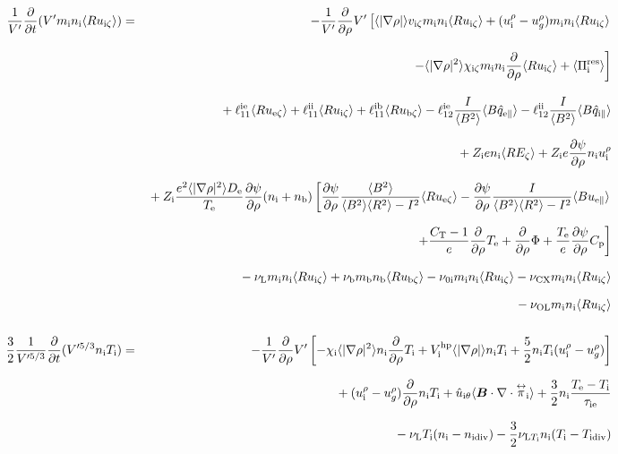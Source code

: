 \documentclass[11pt]{article}
\def\bvec#1{\leavevmode\hbox{\boldmath$#1$}}
\let\vec=\bvec
\def\r#1{{\rm#1}}
\def\aves#1{\langle#1\rangle}
\def\dd#1#2{\frac{\partial #1}{\partial #2}}
\def\tensor#1{\mathord{\displaystyle\mathop{#1}^\leftrightarrow}}
\def\para{\parallel}
\def\ddrho{\frac{\partial}{\partial\rho}}
\def\mi{m_\r{i}}
\def\mb{m_\r{b}}
\def\ni{n_\r{i}}
\def\nb{n_\r{b}}
\def\Te{T_\r{e}}
\def\Ti{T_\r{i}}
\def\Zi{Z_\r{i}}
\def\uezt{u_{\r{e}\zeta}}
\def\uizt{u_{\r{i}\zeta}}
\def\ubzt{u_{\r{b}\zeta}}
\def\uepara{u_{\r{e}\para}}
\def\ubpara{u_{\r{b}\para}}
\def\qhatepara{\hat{q}_{\r{e}\para}}
\def\qhatipara{\hat{q}_{\r{i}\para}}
\def\uirho{u_\r{i}^\rho}
\def\ugrho{u_{g}^\rho}
\def\chii{\chi_\r{i}}
\def\bri{\aves{B^2}\aves{R^2} - I^2}
\def\ddt{\frac{\partial}{\partial t}}
\def\De{D_\r{e}}
\def\nuni{\nu_\r{0i}}
\def\nuL{\nu_\r{L}}
\def\nuCX{\nu_\r{CX}}
\def\nub{\nu_\r{b}}
\def\nidiv{n_\r{idiv}}
\def\Tidiv{T_\r{idiv}}
\def\nuLTi{\nu_{\r{L}T_\r{i}}}
\def\nuOL{\nu_\r{OL}}
\begin{document}
\begin{eqnarray}
\\[5mm]
 \frac{1}{V'} \ddt (V' \mi \ni \aves{R \uizt}) &=&
%
  - \frac{1}{V'} \ddrho V' \left[  \aves{|\nabla\rho|} v_{\r{i}\zeta} \mi \ni \aves{R \uizt}
			       +   (\uirho - \ugrho) \mi \ni \aves{R \uizt} \right.
\nonumber\\[3mm]&&{}
                        \left. - \aves{|\nabla\rho|^2} \chi_{\r{i}\zeta} \mi \ni
			         \ddrho \aves{R \uizt}
                               + \aves{\Pi_\r{i}^\r{res}} \right]
\nonumber\\[3mm]&&{}
%
  + \ell_{11}^\r{ie} \aves{R \uezt}
  + \ell_{11}^\r{ii} \aves{R \uizt}
  + \ell_{11}^\r{ib} \aves{R \ubzt}
%
  - \ell_{12}^\r{ie} \frac{I}{\aves{B^2}} \aves{B \qhatepara}
  - \ell_{12}^\r{ii} \frac{I}{\aves{B^2}} \aves{B \qhatipara}
\nonumber\\[2.5mm]&&{}
%
  + \Zi e                 \ni \aves{R E_\zeta}
%
  + \Zi e \dd{\psi}{\rho} \ni \uirho
%
\nonumber\\[2.5mm]&&{}
%
%
  + \Zi \frac{e^2 \aves{|\nabla\rho|^2} \De}{\Te} \dd{\psi}{\rho} (\ni+\nb)
    \left[  \dd{\psi}{\rho} \frac{\aves{B^2}}{\bri} \aves{R \uezt}
          - \dd{\psi}{\rho} \frac{I}{\bri} \aves{B \uepara} \right.
\nonumber\\[2.5mm]&&{}
    \left.+ \frac{C_\r{T}-1}{e} \ddrho \Te
	  + \ddrho \Phi
	  + \frac{\Te}{e} \dd{\psi}{\rho} C_\r{p} \right]
\nonumber\\[2.5mm]&&{}
%
  - \nuL  \mi \ni \aves{R \uizt}
%
  + \nub  \mb \nb \aves{R \ubzt}
%
  - \nuni \mi \ni \aves{R \uizt}
%
  - \nuCX \mi \ni \aves{R \uizt}
\nonumber\\[2.5mm]&&{}
%
  - \nuOL \mi \ni \aves{R \uizt}
\\[5mm]
 \frac{3}{2}\frac{1}{V'^{5/3}} \ddt (V'^{5/3} \ni \Ti ) &=& 
%
  - \frac{1}{V'} \ddrho V'
    \left[ - \chii          \aves{|\nabla\rho|^2} \ni \ddrho \Ti
           + V_\r{i}^\r{hp} \aves{|\nabla\rho|}   \ni \Ti
           + \frac{5}{2} \ni \Ti ( \uirho - \ugrho ) \right]
\nonumber\\[2.5mm]&&{}
%
  + ( \uirho - \ugrho ) \ddrho \ni \Ti
%
  + \hat{u}_{\r{i}\theta} \aves{\vec{B}\cdot\nabla\cdot\tensor{\pi}_\r{i}}
%
  + \frac{3}{2} \ni \frac{ \Te - \Ti }{\tau_\r{ie}}
\nonumber\\[2.5mm]&&{}
%
  - \nuL \Ti (\ni - \nidiv)
%
  - \frac{3}{2} \nuLTi \ni (\Ti - \Tidiv)
%
\nonumber\\[2.5mm]&&{}

\end{eqnarray}
\end{document}
